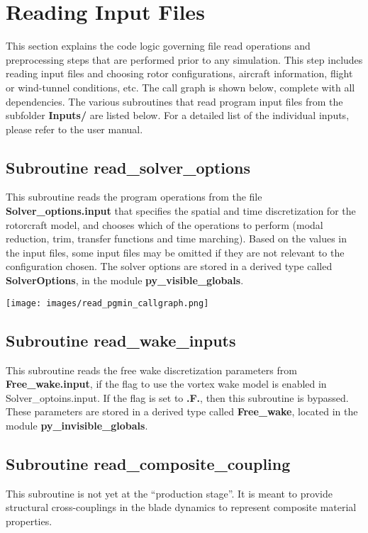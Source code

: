 \section*{Reading Input Files}
This section explains the code logic governing file read operations and preprocessing steps that are performed prior to any simulation. This step includes reading input files and choosing rotor configurations, aircraft information, flight or wind-tunnel conditions, etc. The call graph is shown below, complete with all dependencies. The various subroutines that read program input files from the subfolder \textbf{Inputs/} are listed below. For a detailed list of the individual inputs, please refer to the user manual. 

\subsection{Subroutine read\_solver\_options}
This subroutine reads the program operations from the file \textbf{Solver\_options.input} that specifies the spatial and time discretization for the rotorcraft model, and chooses which of the operations to perform (modal reduction, trim, transfer functions and time marching). Based on the values in the input files, some input files may be omitted if they are not relevant to the configuration chosen. The solver options are stored in a derived type called \textbf{SolverOptions}, in the module \textbf{py\_visible\_globals}.

\begin{Figure}
 \centering
 \texttt{[image: images/read\_pgmin\_callgraph.png]}
 \label{fig:mpcg}
\end{Figure}

\subsection{Subroutine read\_wake\_inputs}
This subroutine reads the free wake discretization parameters from \textbf{Free\_wake.input}, if the flag to use the vortex wake model is enabled in Solver\_optoins.input. If the flag is set to \textbf{.F.}, then this subroutine is bypassed. These parameters are stored in a derived type called \textbf{Free\_wake}, located in the module \textbf{py\_invisible\_globals}.

\subsection{Subroutine read\_composite\_coupling}
This subroutine is not yet at the ``production stage''. It is meant to provide structural cross-couplings in the blade dynamics to represent composite material properties.

